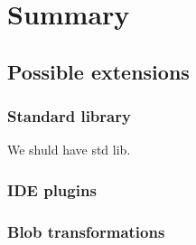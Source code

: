 \chapter{Summary}
\section{Possible extensions}
\subsection{Standard library}
We shuld have std lib.
\subsection{IDE plugins}
\subsection{Blob transformations}
